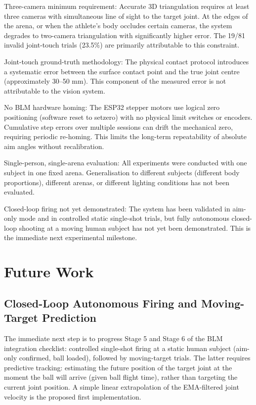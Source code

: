Three-camera minimum requirement: Accurate 3D triangulation requires at least three cameras with simultaneous line of sight to the target joint. At the edges of the arena, or when the athlete's body occludes certain cameras, the system degrades to two-camera triangulation with significantly higher error. The 19/81 invalid joint-touch trials (23.5\%) are primarily attributable to this constraint.

Joint-touch ground-truth methodology: The physical contact protocol introduces a systematic error between the surface contact point and the true joint centre (approximately 30--50 mm). This component of the measured error is not attributable to the vision system.

No BLM hardware homing: The ESP32 stepper motors use logical zero positioning (software reset to setzero) with no physical limit switches or encoders. Cumulative step errors over multiple sessions can drift the mechanical zero, requiring periodic re-homing. This limits the long-term repeatability of absolute aim angles without recalibration.

Single-person, single-arena evaluation: All experiments were conducted with one subject in one fixed arena. Generalisation to different subjects (different body proportions), different arenas, or different lighting conditions has not been evaluated.

Closed-loop firing not yet demonstrated: The system has been validated in aim-only mode and in controlled static single-shot trials, but fully autonomous closed-loop shooting at a moving human subject has not yet been demonstrated. This is the immediate next experimental milestone.

\section{Future Work}

\subsection{Closed-Loop Autonomous Firing and Moving-Target Prediction}

The immediate next step is to progress Stage 5 and Stage 6 of the BLM integration checklist: controlled single-shot firing at a static human subject (aim-only confirmed, ball loaded), followed by moving-target trials. The latter requires predictive tracking: estimating the future position of the target joint at the moment the ball will arrive (given ball flight time), rather than targeting the current joint position. A simple linear extrapolation of the EMA-filtered joint velocity is the proposed first implementation.

